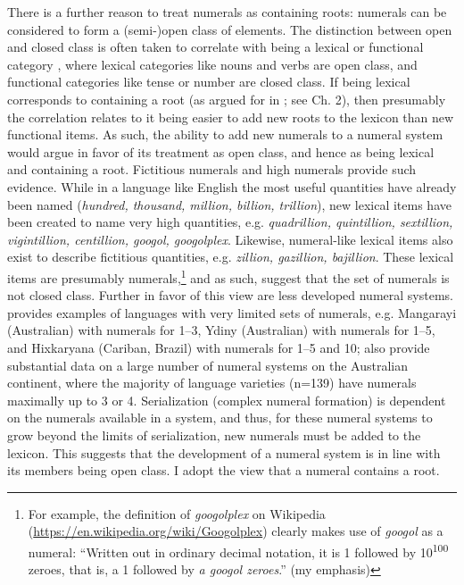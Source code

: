\documentclass[output=paper]{langscibook}
\begin{document}
There is a further reason to treat numerals as containing roots: numerals can be considered to form a (semi-)open class of elements. The distinction between open and closed class is often taken to correlate with being a lexical or functional category \citep[e.g.][]{abney1987english}, where lexical categories like nouns and verbs are open class, and functional categories like tense or number are closed class. If being lexical corresponds to containing a root (as argued for in \citealt{klockmann2017semiLex}; see Ch. 2), then presumably the correlation relates to it being easier to add new roots to the lexicon than new functional items. As such, the ability to add new numerals to a numeral system would argue in favor of its treatment as open class, and hence as being lexical and containing a root. Fictitious numerals and high numerals provide such evidence. While in a language like English the most useful quantities have already been named (\textit{hundred, thousand, million, billion, trillion}), new lexical items have been created to name very high quantities, e.g. \textit{quadrillion, quintillion, sextillion, vigintillion, centillion, googol, googolplex}. Likewise, numeral-like lexical items also exist to describe fictitious quantities, e.g. \textit{zillion, gazillion, bajillion}. These lexical items are presumably numerals,\footnote{For example, the definition of \textit{googolplex} on Wikipedia (\url{https://en.wikipedia.org/wiki/Googolplex}) clearly makes use of \textit{googol} as a numeral: ``Written out in ordinary decimal notation, it is 1 followed by 10\textsuperscript{100} zeroes, that is, a 1 followed by \textit{a googol zeroes}.'' (my emphasis)} and as such, suggest that the set of numerals is not closed class. Further in favor of this view are less developed numeral systems. \citet{comrie2013num} provides examples of languages with very limited sets of numerals, e.g. Mangarayi (Australian) with numerals for 1--3, Ydiny (Australian) with numerals for 1--5, and Hixkaryana (Cariban, Brazil) with numerals for 1--5 and 10; \citet{bowern2012AusNum} also provide substantial data on a large number of numeral systems on the Australian continent, where the majority of language varieties (n=139) have numerals maximally up to 3 or 4. Serialization (complex numeral formation) is dependent on the numerals available in a system, and thus, for these numeral systems to grow beyond the limits of serialization, new numerals must be added to the lexicon. This suggests that the development of a numeral system is in line with its members being open class. I adopt the view that a numeral contains a root.
\end{document}
